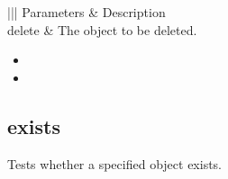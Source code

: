 \documentclass[letterpaper,12pt,english,openany,oneside]{sphinxmanual}
\begin{document}
\begin{savenotes}\sphinxattablestart
\centering
{}\label{\detokenize{IAC_API_AppleEvtObjects:section-19}}\nobreak
\begin{tabular}[t]{|||}
\hline
\sphinxstyletheadfamily 
Parameters
&\sphinxstyletheadfamily 
Description
\\
\hline
delete
&
The object to be deleted.
\\
\hline
\end{tabular}
\par
\sphinxattableend\end{savenotes}
\label{\detokenize{IAC_API_AppleEvtObjects:related-events-1}}
\begin{itemize}
\item {} 

\item {} 

\end{itemize}
\label{\detokenize{IAC_API_AppleEvtObjects:applescript-example-1}}

\begin{sphinxVerbatim}[commandchars=\\\{\}]
     
\end{sphinxVerbatim}




\subsection{exists}
\label{\detokenize{IAC_API_AppleEvtObjects:exists}}
Tests whether a specified object exists.

\label{\detokenize{IAC_API_AppleEvtObjects:syntax-5}}

\begin{sphinxVerbatim}[commandchars=\\\{\}]
\PYG{p}{[}\PYG{p}{]} 

 \PYG{p}{[}\PYG{p}{]}
\end{sphinxVerbatim}
\label{\detokenize{IAC_API_AppleEvtObjects:parameters-5}}
\end{document}
